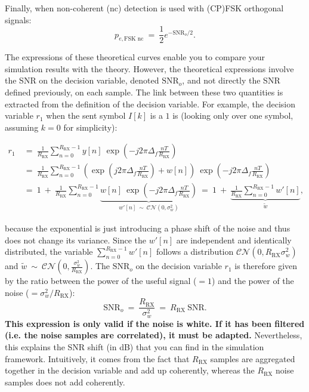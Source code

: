 Finally, when non-coherent (nc) detection is used with (CP)FSK orthogonal signals:
\begin{equation*}
    p_{e,\text{FSK nc}}\:=\:\frac{1}{2}e^{-\text{SNR}_o/2}.
\end{equation*}

The expressions of these theoretical curves enable you to compare your simulation results with the theory. However, the theoretical expressions involve the SNR on the decision variable, denoted $\text{SNR}_o$, and not directly the SNR defined previously, on each sample. The link between these two quantities is extracted from the definition of the decision variable. For example, the decision variable $r_1$ when the sent symbol $I[k]$ is a $1$ is (looking only over one symbol, assuming $k=0$ for simplicity):
\begin{small}
\begin{align*}
    r_1\: &= \:\frac{1}{R_{\text{RX}}}\sum_{n=0}^{R_{\text{RX}}-1} y[n] \:\exp \left(-j2\pi \Delta_f \frac{nT}{R_{\text{RX}}}\right)\\
    &=\:\frac{1}{R_{\text{RX}}}\sum_{n=0}^{R_{\text{RX}}-1} \left(\exp \left(j2\pi \Delta_f \frac{nT}{R_{\text{RX}}}\right)+w[n]\right) \:\exp \left(-j2\pi \Delta_f  \frac{nT}{R_{\text{RX}}}\right)\\
    &=\:1\:+\:\frac{1}{R_{\text{RX}}}\sum_{n=0}^{R_{\text{RX}}-1} \underbrace{w[n] \:\exp \left(-j2\pi \Delta_f \frac{nT}{R_{\text{RX}}}\right)}_{w'[n] \:\sim\: \mathcal{CN}(0,\sigma_w^2)}\:=\:1\:+\:\underbrace{\frac{1}{R_{\text{RX}}}\sum_{n=0}^{R_{\text{RX}}-1} w'[n]}_{\tilde{w}},
\end{align*}
\end{small}
because the exponential is just introducing a phase shift of the noise and thus does not change its variance. Since the $w'[n]$ are independent and identically distributed, the variable $\sum_{n=0}^{R_{\text{RX}}-1} w'[n]$ follows a distribution $\mathcal{CN}(0,R_{\text{RX}}\sigma_w^2)$ and $\tilde{w}\:\sim\:\mathcal{CN}(0,\frac{\sigma_w^2}{R_{\text{RX}}})$. The $\text{SNR}_o$ on the decision variable $r_1$ is therefore given by the ratio between the power of the useful signal ($=1$) and the power of the noise ($=\sigma_w^2/R_{\text{RX}}$):
\begin{equation*}
    \text{SNR}_{o}\:=\:\frac{R_{\text{RX}}}{\sigma_w^2}\:=\:R_{\text{RX}}\: \text{SNR}.
\end{equation*}
\textbf{This expression is only valid if the noise is white. If it has been filtered (i.e. the noise samples are correlated), it must be adapted.} Nevertheless,
this explains the SNR shift (in dB) that you can find in the simulation framework. Intuitively, it comes from the fact that $R_{\text{RX}}$ samples are aggregated together in the decision variable and add up coherently, whereas the $R_{\text{RX}}$ noise samples does not add coherently.

